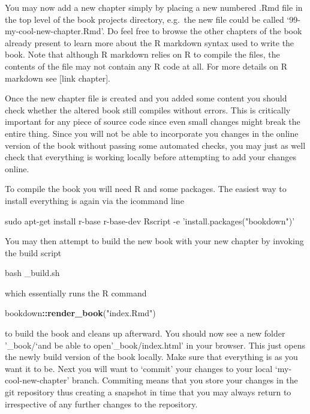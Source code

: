 \documentclass[]{book}
\newenvironment{Shaded}{\begin{snugshade}}{\end{snugshade}}
\newcommand{\KeywordTok}[1]{\textcolor[rgb]{0.13,0.29,0.53}{\textbf{#1}}}
\newcommand{\StringTok}[1]{\textcolor[rgb]{0.31,0.60,0.02}{#1}}
\newcommand{\FunctionTok}[1]{\textcolor[rgb]{0.00,0.00,0.00}{#1}}
\newcommand{\OperatorTok}[1]{\textcolor[rgb]{0.81,0.36,0.00}{\textbf{#1}}}
\newcommand{\ExtensionTok}[1]{#1}
\newcommand{\NormalTok}[1]{#1}
\begin{document}
You may now add a new chapter simply by placing a new numbered .Rmd file
in the top level of the book projects directory, e.g.~the new file could
be called `99-my-cool-new-chapter.Rmd'. Do feel free to browse the other
chapters of the book already present to learn more about the R markdown
syntax used to write the book. Note that although R markdown relies on R
to compile the files, the contents of the file may not contain any R
code at all. For more details on R markdown see {[}link chapter{]}.

Once the new chapter file is created and you added some content you
should check whether the altered book still compiles without errors.
This is critically important for any piece of source code since even
small changes might break the entire thing. Since you will not be able
to incorporate you changes in the online version of the book without
passing some automated checks, you may just as well check that
everything is working locally before attempting to add your changes
online.

To compile the book you will need R and some packages. The easiest way
to install everything is again via the icommand line

\begin{Shaded}
\begin{Highlighting}[]
\FunctionTok{sudo}\NormalTok{ apt-get install r-base r-base-dev }
\ExtensionTok{Rscript}\NormalTok{ -e }\StringTok{'install.packages("bookdown")'}
\end{Highlighting}
\end{Shaded}

You may then attempt to build the new book with your new chapter by
invoking the build script

\begin{Shaded}
\begin{Highlighting}[]
\FunctionTok{bash}\NormalTok{ _build.sh}
\end{Highlighting}
\end{Shaded}

which essentially runs the R command

\begin{Shaded}
\begin{Highlighting}[]
\NormalTok{bookdown}\OperatorTok{::}\KeywordTok{render_book}\NormalTok{(}\StringTok{"index.Rmd"}\NormalTok{)}
\end{Highlighting}
\end{Shaded}

to build the book and cleans up afterward. You should now see a new
folder '\_book/`and be able to open'\_book/index.html' in your browser.
This just opens the newly build version of the book locally. Make sure
that everything is as you want it to be. Next you will want to `commit'
your changes to your local `my-cool-new-chapter' branch. Commiting means
that you store your changes in the git repository thus creating a
snapshot in time that you may always return to irrespective of any
further changes to the repository.
\end{document}
